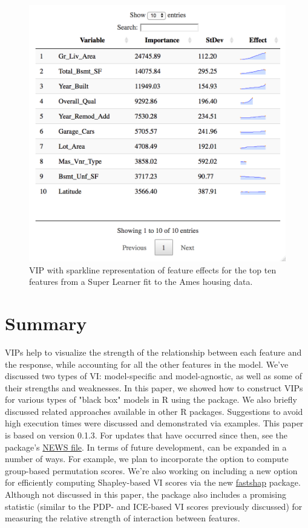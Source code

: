 \begin{figure}[!htb]
  \centering 
  \includegraphics[width=1\linewidth]{figures/ames-sparklines} 
  \caption{VIP with sparkline representation of feature effects for the top ten features from a Super Learner fit to the Ames housing data.}
  \label{fig:sparklines}
\end{figure}


\section{Summary}

VIPs help to visualize the strength of the relationship between each feature and the response, while accounting for all the other features in the model. We've discussed two types of VI: model-specific and model-agnostic, as well as some of their strengths and weaknesses. In this paper, we showed how to construct VIPs for various types of "black box" models in R using the  package. We also briefly discussed related approaches available in other R packages. Suggestions to avoid high execution times were discussed and demonstrated via examples. This paper is based on  version 0.1.3. For updates that have occurred since then, see the package’s \href{https://cran.r-project.org/web/packages/vip/news/news.html}{NEWS file}. In terms of future development,  can be expanded in a number of ways. For example, we plan to incorporate the option to compute group-based permutation scores. We're also working on including a new option for efficiently computing Shapley-based VI scores via the new \href{https://github.com/bgreenwell/fastshap}{fastshap} package. Although not discussed in this paper, the package also includes a promising statistic (similar to the PDP- and ICE-based VI scores previously discussed) for measuring the relative strength of interaction between features. 


